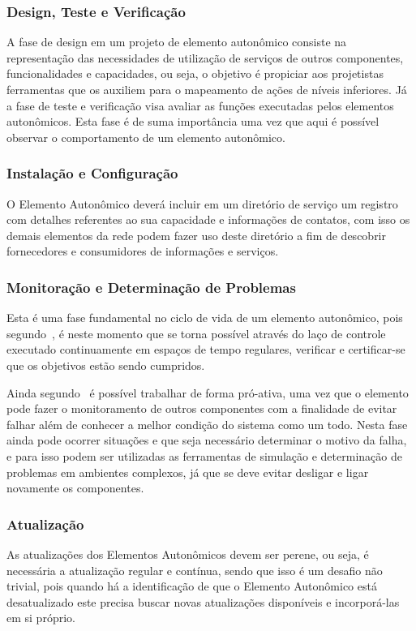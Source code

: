 \documentclass[11pt,twoside]{article}
\begin{document}
\subsubsection{Design, Teste e Verificação}
A fase de design em um projeto de elemento autonômico consiste na representação das necessidades de utilização de serviços de outros componentes, funcionalidades e capacidades, ou seja, o objetivo é propiciar aos projetistas ferramentas que os auxiliem para o mapeamento de ações de níveis inferiores. Já a fase de teste e verificação visa avaliar as funções executadas pelos elementos autonômicos. Esta fase é de suma importância uma vez que aqui é possível observar o comportamento de um elemento autonômico.

\subsubsection{Instalação e Configuração}
O Elemento Autonômico deverá incluir em um diretório de serviço um registro com detalhes referentes ao sua capacidade e informações de contatos, com isso os demais elementos da rede podem fazer uso deste diretório a fim de descobrir fornecedores e consumidores de informações e serviços.

\subsubsection{Monitoração e Determinação de Problemas}
Esta é uma fase fundamental no ciclo de vida de um elemento autonômico, pois segundo~\cite{KEPHART}, é neste momento que se torna possível através do laço de controle executado continuamente em espaços de tempo regulares, verificar e certificar-se que os objetivos estão sendo cumpridos. 

Ainda segundo~\cite{KEPHART} é possível trabalhar de forma pró-ativa, uma vez que o elemento pode fazer o monitoramento de outros componentes com a finalidade de evitar falhar além de conhecer a melhor condição do sistema como um todo. Nesta fase ainda pode ocorrer situações e que seja necessário determinar o motivo da falha, e para isso podem ser utilizadas as ferramentas de simulação e determinação de problemas em ambientes complexos, já que se deve evitar desligar e ligar novamente os componentes.
\subsubsection{Atualização}
As atualizações dos Elementos Autonômicos devem ser perene, ou seja, é necessária a atualização regular e contínua, sendo que isso é um desafio não trivial, pois quando há a identificação de que o Elemento Autonômico está desatualizado este precisa buscar novas atualizações disponíveis e incorporá-las em si próprio.
\end{document}
